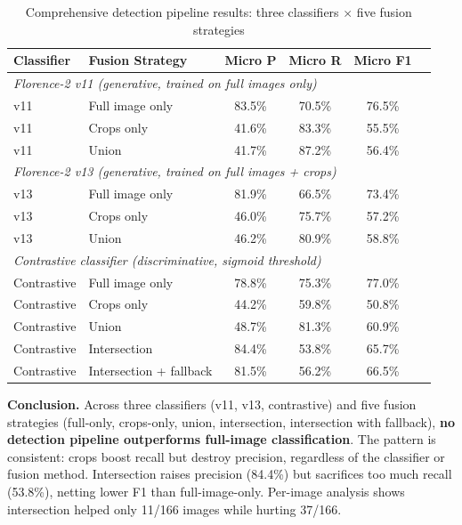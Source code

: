 \documentclass[11pt]{article}
\begin{document}
\begin{table}[h]
\centering
\caption{Comprehensive detection pipeline results: three classifiers $\times$ five fusion strategies}
\label{tab:detection_comprehensive}
\small
\begin{tabular}{llcccc}
\toprule
Classifier & Fusion Strategy & Micro P & Micro R & Micro F1 \\
\midrule
\multicolumn{5}{l}{\textit{Florence-2 v11 (generative, trained on full images only)}} \\
\midrule
v11 & Full image only & 83.5\% & 70.5\% & 76.5\% \\
v11 & Crops only & 41.6\% & 83.3\% & 55.5\% \\
v11 & Union & 41.7\% & 87.2\% & 56.4\% \\
\midrule
\multicolumn{5}{l}{\textit{Florence-2 v13 (generative, trained on full images + crops)}} \\
\midrule
v13 & Full image only & 81.9\% & 66.5\% & 73.4\% \\
v13 & Crops only & 46.0\% & 75.7\% & 57.2\% \\
v13 & Union & 46.2\% & 80.9\% & 58.8\% \\
\midrule
\multicolumn{5}{l}{\textit{Contrastive classifier (discriminative, sigmoid threshold)}} \\
\midrule
Contrastive & Full image only & 78.8\% & 75.3\% & 77.0\% \\
Contrastive & Crops only & 44.2\% & 59.8\% & 50.8\% \\
Contrastive & Union & 48.7\% & 81.3\% & 60.9\% \\
Contrastive & Intersection & 84.4\% & 53.8\% & 65.7\% \\
Contrastive & Intersection + fallback & 81.5\% & 56.2\% & 66.5\% \\
\bottomrule
\end{tabular}
\end{table}

\textbf{Conclusion.} Across three classifiers (v11, v13, contrastive) and five fusion strategies (full-only, crops-only, union, intersection, intersection with fallback), \textbf{no detection pipeline outperforms full-image classification}. The pattern is consistent: crops boost recall but destroy precision, regardless of the classifier or fusion method. Intersection raises precision (84.4\%) but sacrifices too much recall (53.8\%), netting lower F1 than full-image-only. Per-image analysis shows intersection helped only 11/166 images while hurting 37/166.
\end{document}
